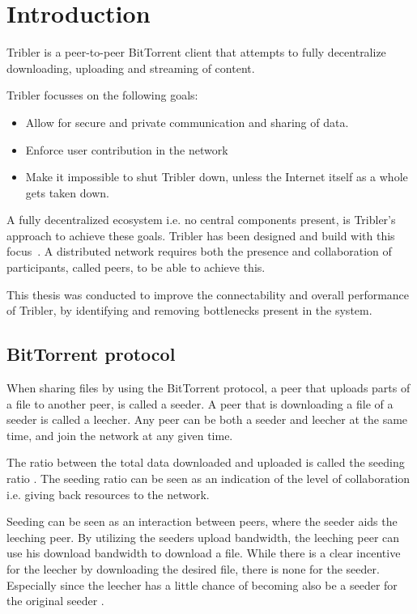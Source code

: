 \chapter{Introduction}
\label{chp:introduction}
Tribler is a peer-to-peer BitTorrent client that attempts to fully decentralize downloading, uploading and streaming of content.

Tribler focusses on the following goals:
\begin{itemize}
    \item Allow for secure and private communication and sharing of data.
    \item Enforce user contribution in the network
    \item Make it impossible to shut Tribler down, unless the Internet itself as a whole gets taken down.
\end{itemize}

A fully decentralized ecosystem i.e. no central components present, is Tribler's approach to achieve these goals.
Tribler has been designed and build with this focus~\cite{Pouwelse-tribler,Bakker-tribler}.
A distributed network requires both the presence and collaboration of participants, called peers, to be able to achieve this.

This thesis was conducted to improve the connectability and overall performance of Tribler, by identifying and removing bottlenecks present in the system.


\section{BitTorrent protocol}
When sharing files by using the BitTorrent protocol, a peer that uploads parts of a file to another peer, is called a seeder.
A peer that is downloading a file of a seeder is called a leecher.
Any peer can be both a seeder and leecher at the same time, and join the network at any given time.

The ratio between the total data downloaded and uploaded is called the seeding ratio \cite{Cohen-bittorrent}.
The seeding ratio can be seen as an indication of the level of collaboration i.e. giving back resources to the network.

Seeding can be seen as an interaction between peers, where the seeder aids the leeching peer.
By utilizing the seeders upload bandwidth, the leeching peer can use his download bandwidth to download a file.
While there is a clear incentive for the leecher by downloading the desired file, there is none for the seeder.
Especially since the leecher has a little chance of becoming also be a seeder for the original seeder \cite{Lai-Incentives}.

